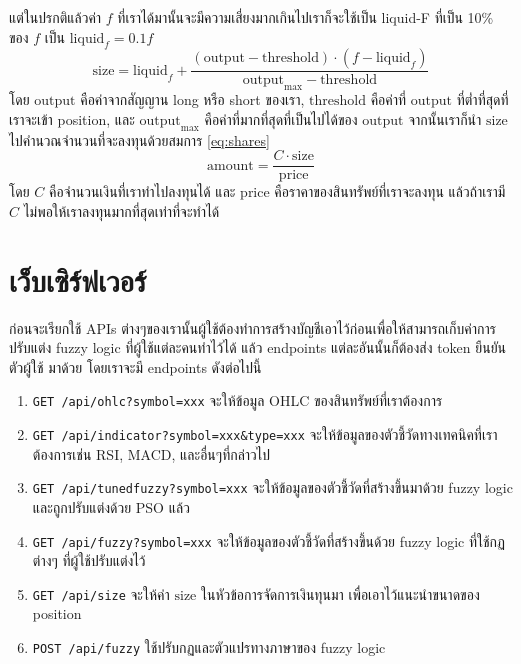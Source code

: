 แต่ในปรกติแล้วค่า $f$ ที่เราได้มานั้นจะมีความเสี่ยงมากเกินไปเราก็จะใช้เป็น liquid-F ที่เป็น 10\% ของ $f$ เป็น $\text{liquid}_f = 0.1f$ 
\begin{equation}
\text{size} = \text{liquid}_f + \frac{(\text{output} - \text{threshold}) \cdot (f - \text{liquid}_f)}{\text{output}_{\text{max}} - \text{threshold}}
\end{equation}
โดย $\text{output}$ คือค่าจากสัญญาน long หรือ short ของเรา, $\text{threshold}$ คือค่าที่ $\text{output}$ ที่ต่ำที่สุดที่เราจะเข้า position, และ 
$\text{output}_{\text{max}}$ คือค่าที่มากที่สุดที่เป็นไปได้ของ $\text{output}$ จากนั้นเราก็นำ $\text{size}$ ไปคำนวณจำนวนที่จะลงทุนด้วยสมการ \ref{eq:shares}
\begin{equation}
\text{amount} = \frac{C \cdot \text{size}}{\text{price}}
\label{eq:shares}
\end{equation}
โดย $C$ คือจำนวนเงินที่เราทำไปลงทุนได้ และ $\text{price}$ คือราคาของสินทรัพย์ที่เราจะลงทุน แล้วถ้าเรามี $C$ ไม่พอให้เราลงทุนมากที่สุดเท่าที่จะทำได้

\section{เว็บเซิร์ฟเวอร์}
ก่อนจะเรียกใช้ APIs ต่างๆของเรานั้นผู้ใช้ต้องทำการสร้างบัญชีเอาไว้ก่อนเพื่อให้สามารถเก็บค่าการปรับแต่ง fuzzy logic ที่ผู้ใช้แต่ละคนทำไว้ได้ แล้ว endpoints แต่ละอันนั้นก็ต้องส่ง token ยืนยันตัวผู้ใช้
มาด้วย โดยเราจะมี endpoints ดังต่อไปนี้
\begin{enumerate}
    \item \texttt{GET /api/ohlc?symbol=xxx} จะให้ข้อมูล OHLC ของสินทรัพย์ที่เราต้องการ
    \item \texttt{GET /api/indicator?symbol=xxx\&type=xxx} จะให้ข้อมูลของตัวชี้วัดทางเทคนิคที่เราต้องการเช่น RSI, MACD, และอื่นๆที่กล่าวไป
    \item \texttt{GET /api/tunedfuzzy?symbol=xxx} จะให้ข้อมูลของตัวชี้วัดที่สร้างขึ้นมาด้วย fuzzy logic และถูกปรับแต่งด้วย PSO แล้ว
    \item \texttt{GET /api/fuzzy?symbol=xxx} จะให้ข้อมูลของตัวชี้วัดที่สร้างขึ้นด้วย fuzzy logic ที่ใช้กฏต่างๆ ที่ผู้ใช้ปรับแต่งไว้
    \item \texttt{GET /api/size} จะให้ค่า $\text{size}$ ในหัวข้อการจัดการเงินทุนมา เพื่อเอาไว้แนะนำขนาดของ position
    \item \texttt{POST /api/fuzzy} ใช้ปรับกฏและตัวแปรทางภาษาของ fuzzy logic
\end{enumerate}

